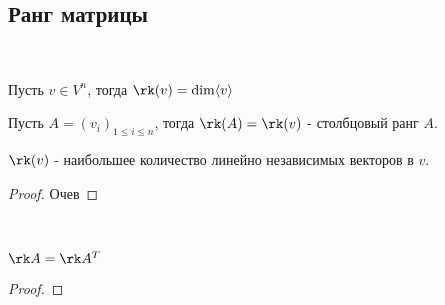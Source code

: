 \subsection{Ранг матрицы}



\begin{defn}~
    
    Пусть $v \in V^n$, тогда $\rk(v) = \dim \langle v \rangle$

    Пусть $A = (v_i)_{1 \le i \le n}$, тогда $\rk(A) = \rk(v)$ - столбцовый ранг $A$.
\end{defn}

\begin{theorem-non}

    $\rk(v)$ - наибольшее количество линейно независимых векторов в $v$.
\end{theorem-non}

\begin{proof}
    Очев
\end{proof}

\begin{theorem}~

    $\rk A = \rk A^T$
\end{theorem}

\begin{proof}
    
\end{proof}